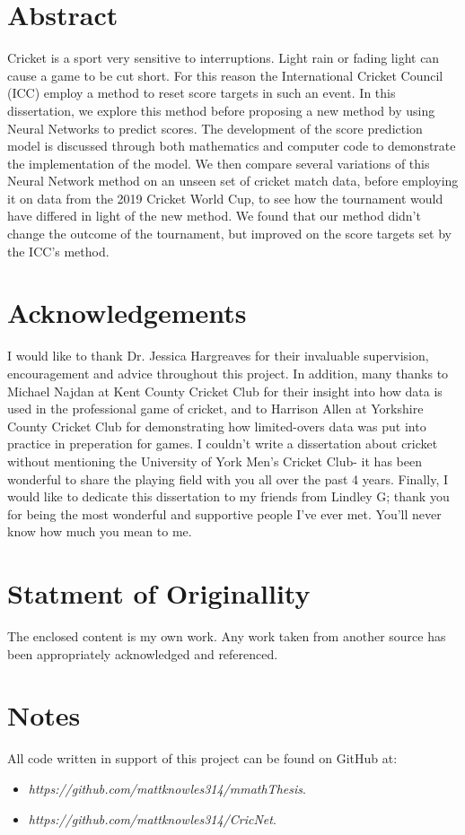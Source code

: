 \documentclass[11pt]{report}
\begin{document}


\section*{Abstract}
Cricket is a sport very sensitive to interruptions. Light rain or fading light can cause a game to be cut short. For this reason 
the International Cricket Council (ICC) employ a method to reset score targets in such an event. In this dissertation, we explore this method 
before proposing a new method by using Neural Networks to predict scores. The development of the score prediction model is discussed through 
both mathematics and computer code to demonstrate the implementation of the model. We then compare several variations of this Neural Network method 
on an unseen set of cricket match data, before employing it on data from the 2019 Cricket World Cup, to see how the tournament would have differed in 
light of the new method. We found that our method didn't change the outcome of the tournament, but improved on the score targets set by the ICC's method.

\section*{Acknowledgements}
I would like to thank Dr. Jessica Hargreaves for their invaluable supervision, encouragement and advice throughout this project. In addition,
many thanks to Michael Najdan at Kent County Cricket Club for their insight into how data is used in the professional game of cricket, and to Harrison Allen at Yorkshire County Cricket Club for demonstrating how limited-overs data was put into practice in preperation for games. 
I couldn't write a dissertation about cricket without mentioning the University of York Men's Cricket Club- it has been wonderful to share the playing field with you all over the past 4 years.
Finally, I would like to dedicate this dissertation to my friends from Lindley G; thank you for being the most wonderful and supportive people I've ever met. You'll never know how much you mean to me.

\section*{Statment of Originallity}
The enclosed content is my own work. Any work taken from another source has been appropriately acknowledged and referenced. 

\section*{Notes}
All code written in support of this project can be found on GitHub at: \\
\begin{itemize}
    \item \textit{https://github.com/mattknowles314/mmathThesis}. 
    \item \textit{https://github.com/mattknowles314/CricNet}.
\end{itemize}
\end{document}
